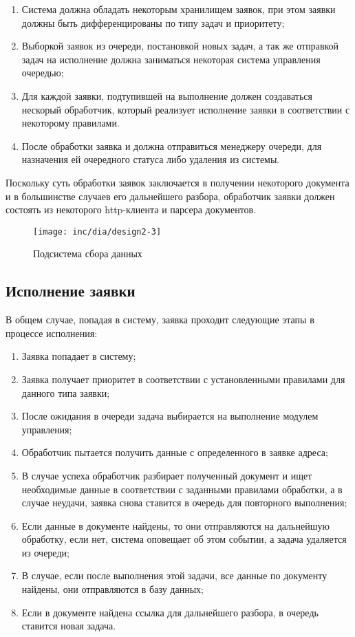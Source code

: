 \begin{enumerate}
	\item Система должна обладать некоторым хранилищем заявок, при этом заявки должны быть дифференцированы по типу задач и приоритету;
	\item Выборкой заявок из очереди, постановкой новых задач, а так же отправкой задач на исполнение должна заниматься некоторая система управления очередью;
	\item Для каждой заявки, подтупившей на выполнение должен создаваться нескорый обработчик, который реализует исполнение заявки в соответствии с некоторому правилами.
	\item После обработки заявка и должна отправиться менеджеру очереди, для  назначения ей очередного статуса либо удаления из системы.
\end{enumerate}
Поскольку суть обработки заявок заключается в получении некоторого документа и в большинстве случаев его дальнейшего разбора, обработчик заявки должен состоять из некоторого http-клиента и парсера документов.

\begin{figure}
  \centering
  \texttt{[image: inc/dia/design2-3]}
  \caption{Подсистема сбора данных}
  \label{fig:fig03}
\end{figure}

\subsection{Исполнение заявки}
В общем случае, попадая в систему, заявка проходит следующие этапы в процессе исполнения:
\begin{enumerate}
	\item Заявка попадает в систему;
	\item Заявка получает приоритет в соответствии с установленными правилами для данного типа заявки;
	\item После ожидания в очереди задача выбирается на выполнение модулем управления;
	\item Обработчик пытается получить данные с определенного в заявке адреса;
	\item В случае успеха обработчик разбирает полученный документ и ищет необходимые данные в соответствии с заданными правилами обработки, а в случае неудачи, заявка снова ставится в очередь для повторного выполнения;
	\item Если данные в документе найдены, то они отправляются на дальнейшую обработку, если нет, система оповещает об этом событии, а задача удаляется из очереди;
	\item В случае, если после выполнения этой задачи, все данные по документу найдены, они отправляются в базу данных;
	\item Если в документе найдена ссылка для дальнейшего разбора, в очередь ставится новая задача.
\end{enumerate}

